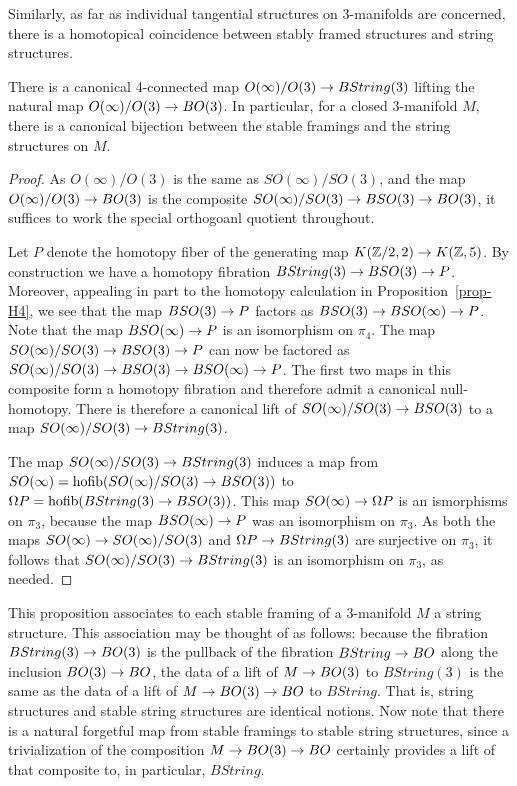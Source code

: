 \documentclass{amsart}
\begin{document}
Similarly, as far as individual tangential structures on 3-manifolds are concerned, there is a homotopical coincidence between stably framed structures and string structures.
\begin{proposition}
There is a canonical 4-connected map $O(\infty)/O(3) \rightarrow BString(3)$ lifting the natural map $O(\infty)/O(3) \rightarrow BO(3)$.  In particular, for a closed 3-manifold $M$, there is a canonical bijection between the stable framings and the string structures on $M$.
\end{proposition} 
\begin{proof}
As $O(\infty)/O(3)$ is the same as $SO(\infty)/SO(3)$, and the map $O(\infty)/O(3) \rightarrow BO(3)$ is the composite $SO(\infty)/SO(3) \rightarrow BSO(3) \rightarrow BO(3)$, it suffices to work the special orthogoanl quotient throughout.

Let $P$ denote the homotopy fiber of the generating map $K(\mathbb Z/2,2) \rightarrow K(\mathbb Z,5)$.  By construction we have a homotopy fibration $BString(3) \rightarrow BSO(3) \rightarrow P$.  Moreover, appealing in part to the homotopy calculation in Proposition~\ref{prop-H4}, we see that the map $BSO(3) \rightarrow P$ factors as $BSO(3) \rightarrow BSO(\infty) \rightarrow P$.  Note that the map $BSO(\infty) \rightarrow P$ is an isomorphism on $\pi_4$.  The map $SO(\infty)/SO(3) \rightarrow BSO(3) \rightarrow P$ can now be factored as $SO(\infty)/SO(3) \rightarrow BSO(3) \rightarrow BSO(\infty) \rightarrow P$.  The first two maps in this composite form a homotopy fibration and therefore admit a canonical null-homotopy.  There is therefore a canonical lift of $SO(\infty)/SO(3) \rightarrow BSO(3)$ to a map $SO(\infty)/SO(3) \rightarrow BString(3)$.

The map $SO(\infty)/SO(3) \rightarrow BString(3)$ induces a map from $SO(\infty) = \operatorname{hofib}(SO(\infty)/SO(3) \rightarrow BSO(3))$ to $\Omega P = \operatorname{hofib}(BString(3) \rightarrow BSO(3))$.  This map $SO(\infty) \rightarrow \Omega P$ is an ismorphisms on $\pi_3$, because the map $BSO(\infty) \rightarrow P$ was an isomorphism on $\pi_3$.  As both the maps $SO(\infty) \rightarrow SO(\infty)/SO(3)$ and $\Omega P \rightarrow BString(3)$ are surjective on $\pi_3$, it follows that $SO(\infty)/SO(3) \rightarrow BString(3)$ is an isomorphism on $\pi_3$, as needed.
\end{proof}

This proposition associates to each stable framing of a 3-manifold $M$ a string structure.  This association may be thought of as follows: because the fibration $BString(3) \rightarrow BO(3)$ is the pullback of the fibration $BString \rightarrow BO$ along the inclusion $BO(3) \rightarrow BO$, the data of a lift of $M \rightarrow BO(3)$ to $BString(3)$ is the same as the data of a lift of $M \rightarrow BO(3) \rightarrow BO$ to $BString$.  That is, string structures and stable string structures are identical notions.  Now note that there is a natural forgetful map from stable framings to stable string structures, since a trivialization of the composition $M \rightarrow BO(3) \rightarrow BO$ certainly provides a lift of that composite to, in particular, $BString$.
\end{document}
